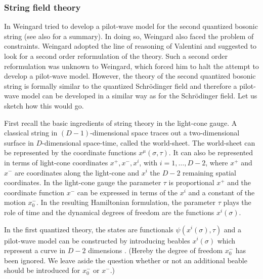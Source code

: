 \documentclass[12pt]{article}
\begin{document}
\subsubsection{String field theory}
In \cite{weingard95} Weingard tried to develop a pilot-wave model for the second quantized bosonic string (see also \cite{huggett99} for a summary). In doing so, Weingard also faced the problem of constraints. Weingard adopted the line of reasoning of Valentini and suggested to look for a second order reformulation of the theory. Such a second order reformulation was unknown to Weingard, which forced him to halt the attempt to develop a pilot-wave model. However, the theory of the second quantized bosonic string is formally similar to the quantized Schr{\"o}\-ding\-er field and therefore a pilot-wave model can be developed in a similar way as for the Schr{\"o}\-ding\-er field. Let us sketch how this would go. 

First recall the basic ingredients of string theory in the light-cone gauge. A classical string in $(D-1)$-dimensional space traces out a two-dimensional surface in $D$-dimensional space-time, called the world-sheet. The world-sheet can be represented by the coordinate functions $x^{\mu}(\sigma,\tau)$. It can also be represented in terms of light-cone coordinates $x^+,x^-,x^i$, with $i=1,\dots,D-2$, where $x^+$ and $x^-$ are coordinates along the light-cone and $x^i$ the $D-2$ remaining spatial coordinates. In the light-cone gauge the parameter $\tau$ is proportional $x^+$ and the coordinate function $x^-$ can be expressed in terms of the $x^i$ and a constant of the motion $x^-_0$. In the resulting Hamiltonian formulation, the parameter $\tau$ plays the role of time and the dynamical degrees of freedom are the functions $x^i(\sigma)$. 

In the first quantized theory, the states are functionals $\psi(x^i(\sigma),\tau)$ \cite{hatfield91} and a pilot-wave model can be constructed by introducing beables $x^i(\sigma)$ which represent a curve in $D-2$ dimensions \cite{weingard95}. (Hereby the degree of freedom $x^-_0$ has been ignored. We leave aside the question whether or not an additional beable should be introduced for $x^-_0$ or $x^-$.) 
\end{document}
